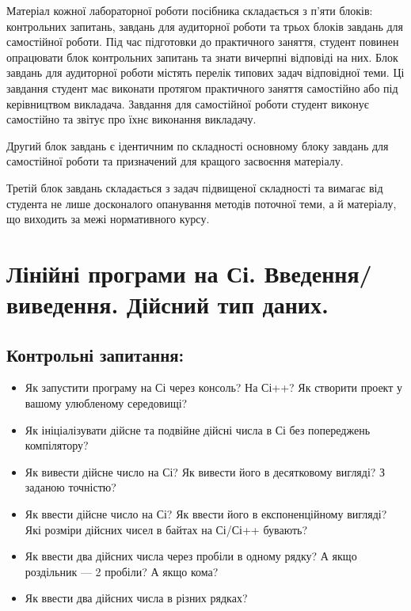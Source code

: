 \documentclass[a5paper,titlepage,openany,twoside,draft]{book_unv}%
\begin{document}
Матеріал кожної лабораторної роботи посібника складається з п'яти
блоків: контрольних запитань, завдань для аудиторної роботи та трьох
блоків завдань для самостійної роботи. Під час підготовки до практичного
заняття, студент повинен опрацювати блок контрольних запитань та знати
вичерпні відповіді на них. Блок завдань для аудиторної роботи містять перелік
типових задач відповідної теми. Ці завдання студент має виконати
протягом практичного заняття самостійно або під керівництвом викладача.
Завдання для самостійної роботи студент виконує самостійно та звітує про
їхнє виконання викладачу. 

Другий блок завдань є ідентичним по складності основному блоку завдань
для самостійної роботи та призначений для кращого засвоєння матеріалу.

Третій блок завдань складається з задач підвищеної складності та вимагає
від студента не лише досконалого опанування методів поточної теми, а й
матеріалу, що виходить за межі нормативного курсу.


\chapter{ Лінійні програми на Сі. Введення/виведення. Дійсний тип даних. }
%

\section{Контрольні запитання:}

\begin{itemize}
\item
Як запустити програму на Сі через консоль? На Сі++? Як створити
проект у вашому улюбленому середовищі?
\item
Як ініціалізувати дійсне та подвійне дійсні числа в Сі без попереджень 
компілятору? 

\item
Як вивести дійсне число на Сі? Як вивести його в десятковому вигляді?
З заданою точністю?

\item
Як ввести дійсне число на Сі? Як ввести його в
експоненційному вигляді? Які розміри дійсних чисел в байтах на Сі/Сі++
бувають?

\item
  Як ввести два дійсних числа через пробіли в одному рядку? А якщо
  роздільник --- 2 пробіли? А якщо кома?
\item
  Як ввести два дійсних числа в різних рядках?

\end{itemize}
\end{document}
